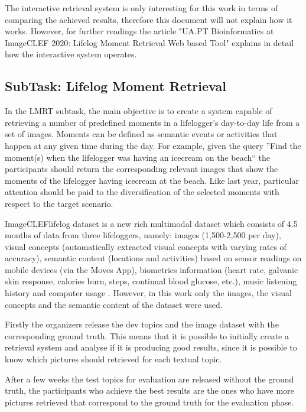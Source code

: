 The interactive retrieval system is only interesting for this work in terms of comparing the achieved results, therefore this document will not explain how it works. However, for further readings the article "UA.PT Bioinformatics at ImageCLEF 2020: Lifelog Moment Retrieval Web based Tool" \cite{Ribeiro2020} explains in detail how the interactive system operates.

    \subsection{SubTask: Lifelog Moment Retrieval}
    In the LMRT subtask, the main objective is to create a system capable of retrieving a number of predefined moments in a lifelogger’s day-to-day life from a set of images. Moments can be defined as semantic events or activities that happen at any given time during the day. For example, given the query ”Find the moment(s) when the lifelogger was having an icecream on the beach“ the participants should return the corresponding relevant images that show the moments of the lifelogger having icecream at the beach. Like last year, particular attention should be paid to the diversification of the selected moments with respect to the target scenario.

    ImageCLEFlifelog dataset is a new rich multimodal dataset which consists of 4.5 months of data from three lifeloggers, namely: images (1,500-2,500 per day), visual concepts (automatically extracted visual concepts with varying rates of accuracy), semantic content (locations and activities) based on sensor readings on mobile devices (via the Moves App), biometrics information (heart rate, galvanic skin response, calories burn, steps, continual blood glucose, etc.), music listening history and computer usage . However, in this work only the images, the visual concepts and the semantic content of the dataset were used. \cite{Ribeiro2020}

    Firstly the organizers release the dev topics and the image dataset with the corresponding ground truth. This means that it is possible to initially create a retrieval system and analyse if it is producing good results, since it is possible to know which pictures should retrieved for each textual topic. 

    After a few weeks the test topics for evaluation are released without the ground truth, the participants who achieve the best results are the ones who have more pictures retrieved that correspond to the ground truth for the evaluation phase.


